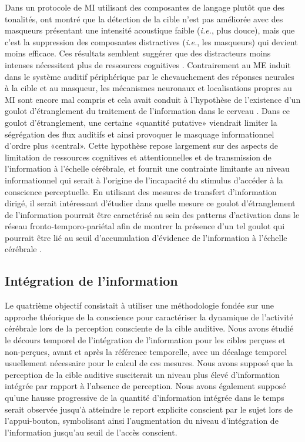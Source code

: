 Dans un protocole de MI utilisant des composantes de langage plutôt que des tonalités, \cite{szalardy2019neuronal} ont montré que la détection de la cible n'est pas améliorée avec des masqueurs présentant une intensité acoustique faible (\textit{i.e.}, plus douce), mais que c'est la suppression des composantes distractives (\textit{i.e.}, les masqueurs) qui devient moins efficace. 
Ces résultats semblent suggérer que des distracteurs moins intenses nécessitent plus de ressources cognitives \citep{szalardy2019neuronal}.
Contrairement au ME induit dans le système auditif périphérique par le chevauchement des réponses neurales à la cible et au masqueur, les mécanismes neuronaux et localisations propres au MI sont encore mal compris \citep{shinn2008object} et cela avait conduit à l'hypothèse de l'existence d'un goulot d'étranglement du traitement de l'information dans le cerveau \citep{overath2007information, gutschalk2008neural}. 
Dans ce goulot d'étranglement, une certaine «quantité putative» viendrait limiter la ségrégation des flux auditifs et ainsi provoquer le masquage informationnel d'ordre plus «central». 
Cette hypothèse repose largement sur des aspects de limitation de ressources cognitives et attentionnelles et de transmission de l'information à l'échelle cérébrale, et fournit une contrainte limitante au niveau informationnel qui serait à l'origine de l'incapacité du stimulus d'accéder à la conscience perceptuelle.  
En utilisant des mesures de transfert d'information dirigé, il serait intéressant d'étudier dans quelle mesure ce goulot d'étranglement de l'information pourrait être caractérisé au sein des patterns d'activation dans le réseau fronto-temporo-pariétal afin de montrer la présence d'un tel goulot qui pourrait être lié au seuil d'accumulation d'évidence de l'information à l'échelle cérébrale \citep{barniv2015auditory, nguyen2020buildup, pereira2021evidence}. 

\subsection{Intégration de l'information}

Le quatrième objectif consistait à utiliser une méthodologie fondée sur une approche théorique de la conscience pour caractériser la dynamique de l'activité cérébrale lors de la perception consciente de la cible auditive.
Nous avons étudié le décours temporel de l’intégration de l’information pour les cibles perçues et non-perçues, avant et après la référence temporelle, avec un décalage temporel usuellement nécessaire pour le calcul de ces mesures. 
Nous avons supposé que la perception de la cible auditive susciterait un niveau plus élevé d'information intégrée par rapport à l'absence de perception. 
Nous avons également supposé qu'une hausse progressive de la quantité d'information intégrée dans le temps serait observée jusqu'à atteindre le report explicite conscient par le sujet lors de l'appui-bouton, symbolisant ainsi l'augmentation du niveau d'intégration de l'information jusqu'au seuil de l'accès conscient. 


